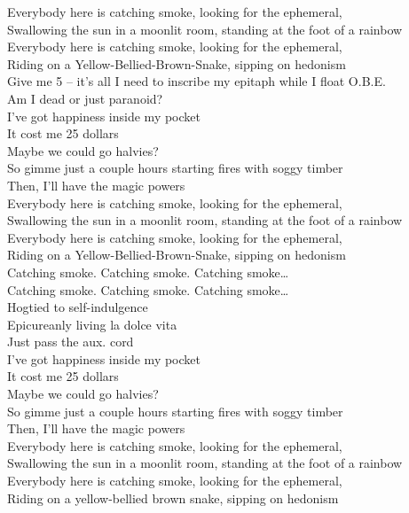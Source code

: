 Everybody here is catching smoke, looking for the ephemeral, \\
Swallowing the sun in a moonlit room, standing at the foot of a rainbow \\
Everybody here is catching smoke, looking for the ephemeral, \\
Riding on a Yellow-Bellied-Brown-Snake, sipping on hedonism \\

Give me 5 -- it's all I need to inscribe my epitaph while I float O.B.E. \\
Am I dead or just paranoid? \\

I've got happiness inside my pocket \\
It cost me 25 dollars \\
Maybe we could go halvies? \\
So gimme just a couple hours starting fires with soggy timber \\
Then, I'll have the magic powers \\

Everybody here is catching smoke, looking for the ephemeral, \\
Swallowing the sun in a moonlit room, standing at the foot of a rainbow \\
Everybody here is catching smoke, looking for the ephemeral, \\
Riding on a Yellow-Bellied-Brown-Snake, sipping on hedonism \\

Catching smoke. Catching smoke. Catching smoke… \\
Catching smoke. Catching smoke. Catching smoke… \\

Hogtied to self-indulgence \\
Epicureanly living la dolce vita \\
Just pass the aux. cord \\

I've got happiness inside my pocket \\
It cost me 25 dollars \\
Maybe we could go halvies? \\
So gimme just a couple hours starting fires with soggy timber \\
Then, I'll have the magic powers \\

Everybody here is catching smoke, looking for the ephemeral, \\
Swallowing the sun in a moonlit room, standing at the foot of a rainbow \\
Everybody here is catching smoke, looking for the ephemeral, \\
Riding on a yellow-bellied brown snake, sipping on hedonism \\

